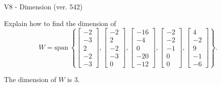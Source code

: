\begin{exercise}
  \begin{exerciseTitle}V8 - Dimension (ver. 542)\end{exerciseTitle}
  \begin{exerciseStatement}
    Explain how to find the dimension of 
\[W=\mathrm{span}\ \left\{\left[\begin{array}{r}
-2 \\
-3 \\
2 \\
-2 \\
-3
\end{array}\right] , \left[\begin{array}{r}
-2 \\
2 \\
-2 \\
-3 \\
0
\end{array}\right] , \left[\begin{array}{r}
-16 \\
-4 \\
0 \\
-20 \\
-12
\end{array}\right] , \left[\begin{array}{r}
-2 \\
-2 \\
-1 \\
0 \\
0
\end{array}\right] , \left[\begin{array}{r}
4 \\
-2 \\
9 \\
-1 \\
-6
\end{array}\right]\right\}.\]



  \end{exerciseStatement}
  \begin{exerciseAnswer}
   The dimension of \(W\) is  \(3\).
  


  \end{exerciseAnswer}
\end{exercise}